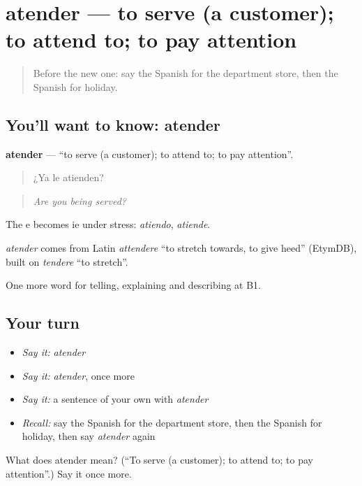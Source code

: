 \section[atender]{atender — to serve (a customer); to attend to; to pay attention}

\label{lesson:ES-C681-atender}



\begin{quote}
Before the new one: say the Spanish for the department store, then the Spanish for holiday.
\end{quote}

\subsection*{You'll want to know: atender}
\textbf{atender} — \textquotedblleft{}to serve (a customer); to attend to; to pay attention\textquotedblright{}.

\begin{quote}
¿Ya le atienden?
\end{quote}

\begin{quote}
\emph{Are you being served?}
\end{quote}

The e becomes ie under stress: \emph{atiendo}, \emph{atiende}.

\begin{cousinweb}
\emph{atender} comes from Latin \emph{attendere} \textquotedblleft{}to stretch towards, to give heed\textquotedblright{} (EtymDB), built on \emph{tendere} \textquotedblleft{}to stretch\textquotedblright{}.
\end{cousinweb}

\begin{grammarlens}[title={What you've built}]
One more word for telling, explaining and describing at B1.
\end{grammarlens}

\subsection*{Your turn}
\begin{itemize}
\raggedright
  \item \emph{Say it:} \emph{atender}
  \item \emph{Say it:} \emph{atender}, once more
  \item \emph{Say it:} a sentence of your own with \emph{atender}
  \item \emph{Recall:} say the Spanish for the department store, then the Spanish for holiday, then say \emph{atender} again
\end{itemize}

\begin{tcolorbox}[breakable,colback=teal!4,colframe=teal!35!black,title={Before you move on}]
What does atender mean? (\textquotedblleft{}To serve (a customer); to attend to; to pay attention\textquotedblright{}.) Say it once more.
\end{tcolorbox}
